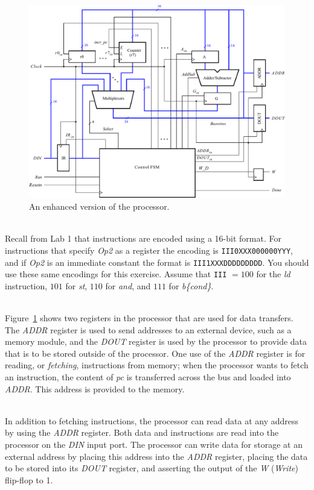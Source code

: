 \documentclass[epsfig,10pt,fullpage]{article}
\begin{document}
\begin{figure}[H]
\begin{center}
\includegraphics[scale = 0.8]{figures/figure12.pdf}
\end{center}
\caption{An enhanced version of the processor.}
\label{fig:fig12}
\end{figure}

~\\
\noindent
Recall from Lab 1 that instructions are encoded using a 16-bit format. For instructions
that specify {\it Op2} as a register the encoding is \texttt{III0XXX000000YYY}, and if {\it Op2}
is an immediate constant the format is \texttt{III1XXXDDDDDDDDD}. You should use these 
same encodings for this exercise. Assume that \texttt{III} $= 100$ for the {\it ld} instruction,
$101$ for {\it st}, $110$ for {\it and}, and $111$ for {\it b\{cond\}}.

~\\
Figure~\ref{fig:fig12} shows two registers in the processor that are used for data transfers. The 
{\it ADDR} register is used to send addresses to an external device, such as a memory module,
and the {\it DOUT} register is used by the processor to provide data that is to be stored outside 
of the processor. One use of the {\it ADDR} register is for reading, or {\it fetching}, 
instructions from memory; when the processor wants to fetch an instruction, the content
of {\it pc} is transferred across the bus and loaded into {\it ADDR}. This address is 
provided to the memory.

~\\
In addition to fetching instructions, the processor can read data 
at any address by using the {\it ADDR} register. Both data and instructions are read into 
the processor on the {\it DIN} input port.  The processor can write data for storage at 
an external address by placing this address into the {\it ADDR} register, placing the data 
to be stored into its {\it DOUT} register, and asserting the output of the {\it W} 
({\it Write}) flip-flop to 1. 
\end{document}
